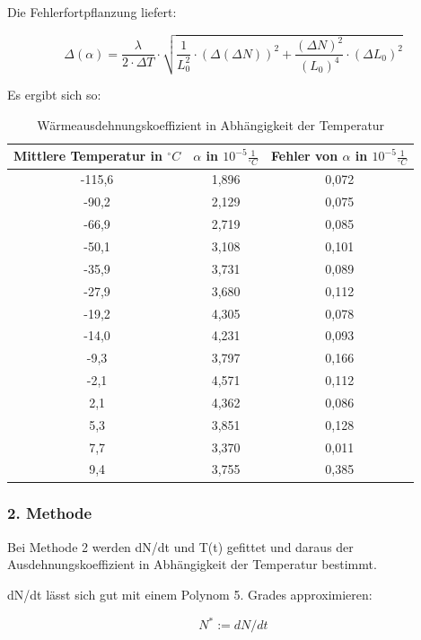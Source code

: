 Die Fehlerfortpflanzung liefert:

\begin{equation}
\Delta (\alpha) = \frac{\lambda}{2 \cdot \Delta T} \cdot \sqrt{\frac{1}{L_{0}^{2}} \cdot (\Delta(\Delta N))^{2} + \frac{(\Delta N)^{2}}{(L_{0})^{4}} \cdot (\Delta L_{0})^{2}}
\end{equation}


Es ergibt sich so:

\begin{table}
\begin{tabular}{|c|c|c|}
\hline
Mittlere Temperatur in $^{\circ}C$ &$ \alpha $ in $ 10^{-5}\frac {1}{^{\circ}C} $	&Fehler von $ \alpha $ in $ 10^{-5} \frac{1}{^{\circ}C}  $ \\
\hline
-115,6&				1,896	&		0,072\\
\hline
-90,2	&			2,129	&		0,075\\
\hline
-66,9	&			2,719	&		0,085\\
\hline
-50,1	&			3,108	&		0,101\\
\hline
-35,9	&			3,731	&		0,089\\
\hline
-27,9	&			3,680	&		0,112\\
\hline
-19,2	&			4,305	&		0,078\\
\hline
-14,0	&			4,231	&		0,093\\
\hline
-9,3	&			3,797	&		0,166\\
\hline
-2,1	&			4,571	&		0,112\\
\hline
2,1		&		4,362		&	0,086\\
\hline
5,3		&		3,851		&	0,128\\
\hline
7,7		&		3,370		&	0,011\\
\hline
9,4		&		3,755		&	0,385\\
\hline
\end{tabular}
\label{tbl_4}
\caption{Wärmeausdehnungskoeffizient in Abhängigkeit der Temperatur}
\end{table}



\subsubsection{2. Methode}

Bei Methode 2 werden dN/dt und T(t) gefittet und daraus der Ausdehnungskoeffizient in Abhängigkeit der Temperatur bestimmt.

dN/dt lässt sich gut mit einem Polynom 5. Grades approximieren:

\begin{equation}
 N^{*} := dN/dt 
\end{equation}

